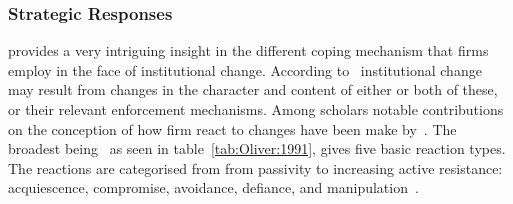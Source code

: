 \subsubsection{Strategic Responses}
\cite{Cantwell:2009hg} provides a very intriguing insight in the different coping mechanism that firms employ in the face of institutional change.
According to~\cite{North:1990vl} institutional change may result from changes in the character and content of either or both of these, or their relevant enforcement mechanisms.
Among scholars notable contributions on the conception of how firm react to changes have been make by~\citep{Oliver:1991tm,Cantwell:2009hg}.
The broadest being~\cite{Oliver:1991tm} as seen in table~\ref{tab:Oliver:1991}, gives five basic reaction types.
The reactions are categorised from from passivity to increasing active resistance: acquiescence, compromise, avoidance, defiance, and manipulation~\citep{Oliver:1991tm}.


